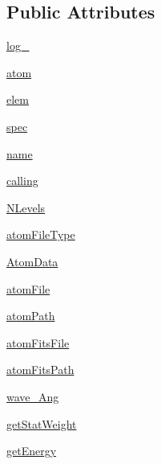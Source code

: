 \subsection*{Public Attributes}
\begin{DoxyCompactItemize}
\item 
\hyperlink{classpyneb_1_1core_1_1pynebcore_1_1_atom_afd87151907f32bc0dc45f0171b61374e}{log\-\_\-}
\item 
\hyperlink{classpyneb_1_1core_1_1pynebcore_1_1_atom_a0c5c7091b1d8a95d9bee2744d713f5c9}{atom}
\item 
\hyperlink{classpyneb_1_1core_1_1pynebcore_1_1_atom_a62e73dc66c7aff7941c5ce94e808c23a}{elem}
\item 
\hyperlink{classpyneb_1_1core_1_1pynebcore_1_1_atom_adaf1b66faf18504ec4b5c8c0b7f6763b}{spec}
\item 
\hyperlink{classpyneb_1_1core_1_1pynebcore_1_1_atom_ab74e6bf80237ddc4109968cedc58c151}{name}
\item 
\hyperlink{classpyneb_1_1core_1_1pynebcore_1_1_atom_ab25fa7ebe84b603684dee62410c1e34c}{calling}
\item 
\hyperlink{classpyneb_1_1core_1_1pynebcore_1_1_atom_a4d45fe163c2108853ab418386bf4da56}{N\-Levels}
\item 
\hyperlink{classpyneb_1_1core_1_1pynebcore_1_1_atom_ad25761817a2ae4417305b5ac84633a6f}{atom\-File\-Type}
\item 
\hyperlink{classpyneb_1_1core_1_1pynebcore_1_1_atom_a7950e5502817549deb71dd14b52c1c4d}{Atom\-Data}
\item 
\hyperlink{classpyneb_1_1core_1_1pynebcore_1_1_atom_afa3c4660b3bcf1e2c199413048b9209e}{atom\-File}
\item 
\hyperlink{classpyneb_1_1core_1_1pynebcore_1_1_atom_a18178a28ecf0c7f251d0974c2097b214}{atom\-Path}
\item 
\hyperlink{classpyneb_1_1core_1_1pynebcore_1_1_atom_a80c24f287a25f67b489b472164691ea6}{atom\-Fits\-File}
\item 
\hyperlink{classpyneb_1_1core_1_1pynebcore_1_1_atom_a8d37532338fe8cf09d17000a7ae46d53}{atom\-Fits\-Path}
\item 
\hyperlink{classpyneb_1_1core_1_1pynebcore_1_1_atom_ab5130f33e76a12670614a4ecf47211b0}{wave\-\_\-\-Ang}
\item 
\hyperlink{classpyneb_1_1core_1_1pynebcore_1_1_atom_a76da9219880b92ab31bfbff268b9ddc9}{get\-Stat\-Weight}
\item 
\hyperlink{classpyneb_1_1core_1_1pynebcore_1_1_atom_a25f8bf6829f1707a2e51c73ed35c8301}{get\-Energy}
\item 

\end{DoxyCompactItemize}
